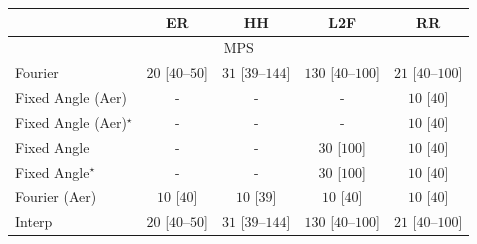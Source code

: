 \begin{tabular}{l|cccc|}
\toprule
            & ER & HH & L2F & RR \\
\midrule
\multicolumn{5}{c}{\rule{0pt}{8pt}MPS} \\
\midrule
Fourier & {\cellcolor[HTML]{F5FBF3}} \color[HTML]{000000} $20$ [$40$--$50$] & {\cellcolor[HTML]{F4FBF1}} \color[HTML]{000000} $31$ [$39$--$144$] & {\cellcolor[HTML]{DFF3DA}} \color[HTML]{000000} $130$ [$40$--$100$] & {\cellcolor[HTML]{F5FBF3}} \color[HTML]{000000} $21$ [$40$--$100$] \\
Fixed Angle (Aer) & {\cellcolor[HTML]{000000}} \color[HTML]{F1F1F1} {\cellcolor{white}} \color{black} - & {\cellcolor[HTML]{000000}} \color[HTML]{F1F1F1} {\cellcolor{white}} \color{black} - & {\cellcolor[HTML]{000000}} \color[HTML]{F1F1F1} {\cellcolor{white}} \color{black} - & {\cellcolor[HTML]{F7FCF5}} \color[HTML]{000000} $10$ [$40$] \\
Fixed Angle (Aer)$^\star$ & {\cellcolor[HTML]{000000}} \color[HTML]{F1F1F1} {\cellcolor{white}} \color{black} - & {\cellcolor[HTML]{000000}} \color[HTML]{F1F1F1} {\cellcolor{white}} \color{black} - & {\cellcolor[HTML]{000000}} \color[HTML]{F1F1F1} {\cellcolor{white}} \color{black} - & {\cellcolor[HTML]{F7FCF5}} \color[HTML]{000000} $10$ [$40$] \\
Fixed Angle & {\cellcolor[HTML]{000000}} \color[HTML]{F1F1F1} {\cellcolor{white}} \color{black} - & {\cellcolor[HTML]{000000}} \color[HTML]{F1F1F1} {\cellcolor{white}} \color{black} - & {\cellcolor[HTML]{F4FBF1}} \color[HTML]{000000} $30$ [$100$] & {\cellcolor[HTML]{F7FCF5}} \color[HTML]{000000} $10$ [$40$] \\
Fixed Angle$^\star$ & {\cellcolor[HTML]{000000}} \color[HTML]{F1F1F1} {\cellcolor{white}} \color{black} - & {\cellcolor[HTML]{000000}} \color[HTML]{F1F1F1} {\cellcolor{white}} \color{black} - & {\cellcolor[HTML]{F4FBF1}} \color[HTML]{000000} $30$ [$100$] & {\cellcolor[HTML]{F7FCF5}} \color[HTML]{000000} $10$ [$40$] \\
Fourier (Aer) & {\cellcolor[HTML]{F7FCF5}} \color[HTML]{000000} $10$ [$40$] & {\cellcolor[HTML]{F7FCF5}} \color[HTML]{000000} $10$ [$39$] & {\cellcolor[HTML]{F7FCF5}} \color[HTML]{000000} $10$ [$40$] & {\cellcolor[HTML]{F7FCF5}} \color[HTML]{000000} $10$ [$40$] \\
Interp & {\cellcolor[HTML]{F5FBF3}} \color[HTML]{000000} $20$ [$40$--$50$] & {\cellcolor[HTML]{F4FBF1}} \color[HTML]{000000} $31$ [$39$--$144$] & {\cellcolor[HTML]{DFF3DA}} \color[HTML]{000000} $130$ [$40$--$100$] & {\cellcolor[HTML]{F5FBF3}} \color[HTML]{000000} $21$ [$40$--$100$] \\

\end{tabular}
